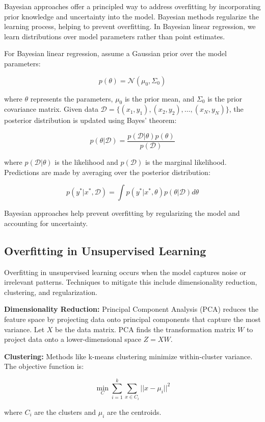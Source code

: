 \documentclass[12pt]{book} %
\begin{document}
Bayesian approaches offer a principled way to address overfitting by incorporating prior knowledge and uncertainty into the model. Bayesian methods regularize the learning process, helping to prevent overfitting. In Bayesian linear regression, we learn distributions over model parameters rather than point estimates.

For Bayesian linear regression, assume a Gaussian prior over the model parameters:

\[
p(\theta) = \mathcal{N}(\mu_0, \Sigma_0)
\]

where \( \theta \) represents the parameters, \( \mu_0 \) is the prior mean, and \( \Sigma_0 \) is the prior covariance matrix. Given data \( \mathcal{D} = \{(x_1, y_1), (x_2, y_2), \ldots, (x_N, y_N)\} \), the posterior distribution is updated using Bayes' theorem:

\[
p(\theta | \mathcal{D}) = \frac{p(\mathcal{D} | \theta) p(\theta)}{p(\mathcal{D})}
\]

where \( p(\mathcal{D} | \theta) \) is the likelihood and \( p(\mathcal{D}) \) is the marginal likelihood. Predictions are made by averaging over the posterior distribution:

\[
p(y^* | x^*, \mathcal{D}) = \int p(y^* | x^*, \theta) p(\theta | \mathcal{D}) d\theta
\]

Bayesian approaches help prevent overfitting by regularizing the model and accounting for uncertainty.

\subsection{Overfitting in Unsupervised Learning}

Overfitting in unsupervised learning occurs when the model captures noise or irrelevant patterns. Techniques to mitigate this include dimensionality reduction, clustering, and regularization.

\textbf{Dimensionality Reduction:} Principal Component Analysis (PCA) reduces the feature space by projecting data onto principal components that capture the most variance. Let \( X \) be the data matrix. PCA finds the transformation matrix \( W \) to project data onto a lower-dimensional space \( Z = XW \).

\textbf{Clustering:} Methods like k-means clustering minimize within-cluster variance. The objective function is:

\[
\min_{C} \sum_{i=1}^{k} \sum_{x \in C_i} ||x - \mu_i||^2
\]

where \( C_i \) are the clusters and \( \mu_i \) are the centroids.
\end{document}
